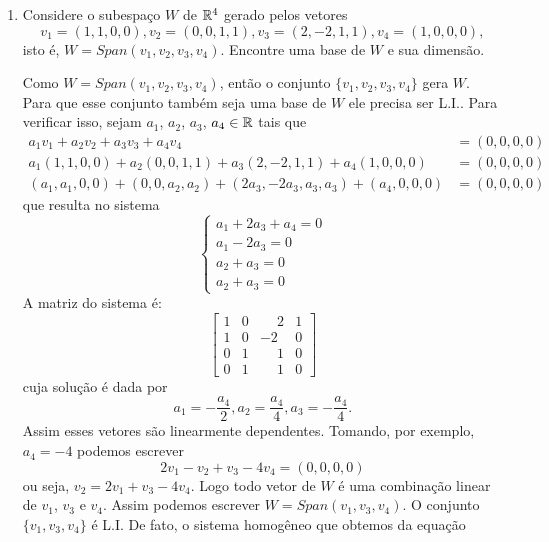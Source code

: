 \begin{exemplos}
  \begin{enumerate}
    \item Considere o subespaço $W$ de $\mathbb{R}^4$ gerado pelos vetores
      \[
        v_1 = (1, 1, 0, 0), v_2 = (0, 0, 1, 1), v_3 = (2, -2, 1, 1), v_4 = (1, 0, 0, 0),
      \]
      isto é, $W = Span(v_1, v_2, v_3, v_4)$. Encontre uma base de $W$ e sua dimensão.
      \begin{solucao}
        Como $W = Span(v_1, v_2, v_3, v_4)$, então o conjunto $\{v_1, v_2, v_3, v_4\}$ gera $W$. Para que esse conjunto também seja uma base de $W$ ele precisa ser L.I.. Para verificar isso, sejam $a_1$, $a_2$, $a_3$, $a_4 \in \mathbb{R}$ tais que
        \begin{align*}
          a_1v_1 + a_2v_2 + a_3v_3 + a_4v_4 &= (0, 0, 0, 0)\\
          a_1(1, 1, 0, 0) + a_2(0, 0, 1, 1) + a_3(2, -2, 1, 1) + a_4(1, 0, 0, 0) &= (0, 0, 0, 0)\\
          (a_1, a_1, 0, 0) + (0, 0, a_2, a_2) + (2a_3, -2a_3, a_3, a_3) + (a_4, 0, 0, 0) &= (0, 0, 0, 0)
        \end{align*}
        que resulta no sistema
        \begin{equation*}
          \begin{cases}
            a_1 + 2a_3 + a_4 = 0\\
            a_1 - 2a_3 = 0\\
            a_2 + a_3 = 0\\
            a_2 + a_3 = 0
          \end{cases}
        \end{equation*}
        A matriz do sistema é:
        \[
          \begin{bmatrix}
            1 & 0 & \phantom{-}2 & 1\\
            1 & 0 & -2 & 0\\
            0 & 1 & \phantom{-}1 & 0\\
            0 & 1 & \phantom{-}1 & 0
          \end{bmatrix}
        \]
        cuja solução é dada por
        \[
          a_1 = -\dfrac{a_4}{2}, a_2 = \dfrac{a_4}{4}, a_3 = -\dfrac{a_4}{4}.
        \]
        Assim esses vetores são linearmente dependentes. Tomando, por exemplo, $a_4 = -4$ podemos escrever
        \[
          2v_1 - v_2 + v_3 - 4v_4 = (0, 0, 0, 0)
        \]
        ou seja, $v_2 = 2v_1 + v_3 - 4v_4$. Logo todo vetor de $W$ é uma combinação linear de $v_1$, $v_3$ e $v_4$. Assim podemos escrever $W = Span(v_1, v_3, v_4)$. O conjunto $\{v_1, v_3, v_4\}$ é L.I. De fato, o sistema homogêneo que obtemos da equação

\end{solucao}
\end{enumerate}
\end{exemplos}
